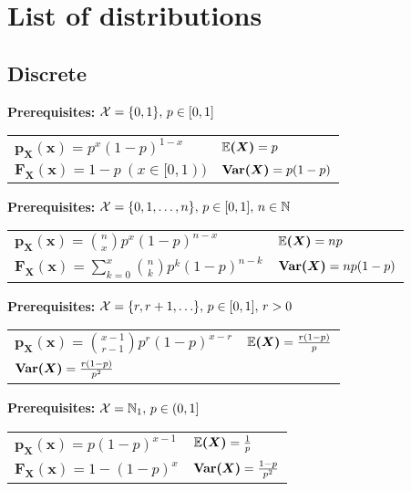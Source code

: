 \section{List of distributions}
\subsection*{Discrete}

\renewcommand{\arraystretch}{1.8}
\begin{ddefinition*}
  \textbf{Prerequisites:} \(\operatorname{\mathcal{X}} = \{0, 1\}, \, p \in [0, 1]\) \\
  \begin{tabularx}{\linewidth}{@{}ll@{}}
    \(\bm{p_X(x)} = p^x(1 - p)^{1 - x}\) & \(\bm{\mathbb{E}(X)} = p\) \\
    \(\bm{F_X(x)} = 1 - p \ (x \in [0, 1))\) & \(\bm{\Var(X)} = p(1 - p)\)
  \end{tabularx}
\end{ddefinition*}

\begin{ddefinition*}
  \textbf{Prerequisites:} \(\operatorname{\mathcal{X}} = \{0, 1, \ldots, n\}, \, p \in [0, 1], \, n \in \mathbb{N}\) \\
  \begin{tabularx}{\linewidth}{@{}ll@{}}
    \(\bm{p_X(x)} = \binom{n}{x}p^x(1 - p)^{n - x}\) & \(\bm{\mathbb{E}(X)} = np\) \\
    \(\bm{F_X(x)} = \sum\limits_{k = 0}^x \binom{n}{k}p^k (1-p)^{n-k}\) & \(\bm{\Var(X)} = np(1 - p)\)
  \end{tabularx}
\end{ddefinition*}

\begin{ddefinition*}
  \textbf{Prerequisites:} \(\operatorname{\mathcal{X}} = \{r, r+1, \ldots\}, \, p \in [0, 1], \, r > 0\) \\
  \begin{tabularx}{\linewidth}{@{}ll@{}}
    \(\bm{p_X(x)} = \binom{x - 1}{r - 1}p^r(1 - p)^{x - r}\) & \(\bm{\mathbb{E}(X)} = \frac{r(1 - p)}{p}\) \\
    \(\bm{\Var(X)} = \frac{r(1 - p)}{p^2}\)
  \end{tabularx}
\end{ddefinition*}

\begin{ddefinition*}
  \textbf{Prerequisites:} \(\operatorname{\mathcal{X}} = \mathbb{N}_1, \, p \in (0, 1]\) \\
  \begin{tabularx}{\linewidth}{@{}ll@{}}
    \(\bm{p_X(x)} = p(1-p)^{x-1}\) & \(\bm{\mathbb{E}(X)} = \frac{1}{p}\) \\
    \(\bm{F_X(x)} = 1 - (1 - p)^x\) & \(\bm{\Var(X)} = \frac{1 - p}{p^2}\)
  \end{tabularx}
\end{ddefinition*}

